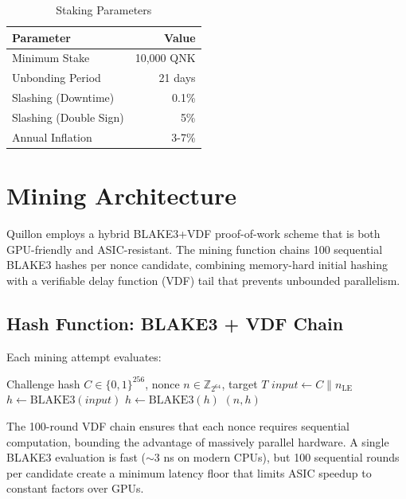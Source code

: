 \documentclass[11pt,a4paper]{article}
\begin{document}
\begin{table}[h]
\centering
\begin{tabular}{|l|r|}
\hline
\textbf{Parameter} & \textbf{Value} \\
\hline
Minimum Stake & 10,000 QNK \\
Unbonding Period & 21 days \\
Slashing (Downtime) & 0.1\% \\
Slashing (Double Sign) & 5\% \\
Annual Inflation & 3-7\% \\
\hline
\end{tabular}
\caption{Staking Parameters}
\end{table}

\section{Mining Architecture}

Quillon employs a hybrid BLAKE3+VDF proof-of-work scheme that is both GPU-friendly and ASIC-resistant. The mining function chains 100 sequential BLAKE3 hashes per nonce candidate, combining memory-hard initial hashing with a verifiable delay function (VDF) tail that prevents unbounded parallelism.

\subsection{Hash Function: BLAKE3 + VDF Chain}

Each mining attempt evaluates:

\begin{algorithm}
\caption{BLAKE3+VDF Mining (per nonce candidate)}
\begin{algorithmic}[1]
\REQUIRE Challenge hash $C \in \{0,1\}^{256}$, nonce $n \in \mathbb{Z}_{2^{64}}$, target $T$
\STATE $\mathit{input} \leftarrow C \| n_{\mathrm{LE}}$ 
\STATE $h \leftarrow \mathrm{BLAKE3}(\mathit{input})$ 
    \STATE $h \leftarrow \mathrm{BLAKE3}(h)$ 
\ENDFOR
{}
    \RETURN $(n, h)$ 
\ENDIF
\end{algorithmic}
\end{algorithm}

The 100-round VDF chain ensures that each nonce requires sequential computation, bounding the advantage of massively parallel hardware. A single BLAKE3 evaluation is fast ($\sim$3 ns on modern CPUs), but 100 sequential rounds per candidate create a minimum latency floor that limits ASIC speedup to constant factors over GPUs.
\end{document}
